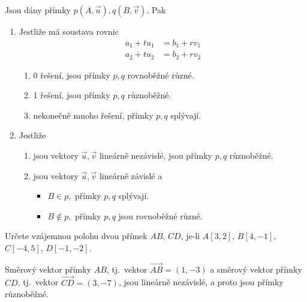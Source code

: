\begin{veta}
    Jsou dány přímky $p(A,\vec u), q(B,\vec v).$ Pak
    \begin{enumerate}[$i.$]
    \item Jestliže má soustava rovnic
    \begin{align*}
        a_1+tu_1 &= b_1 + rv_1 \\
        a_2+tu_2 &= b_2 + rv_2
    \end{align*}
    \begin{enumerate}[$a.$]
    \item 0 řešení, jsou přímky $p,q$ rovnoběžné různé.
   	\item 1 řešení, jsou přímky $p,q$ různoběžné.
   	\item nekonečně mnoho řešení, přímky $p,q$ splývají.
    \end{enumerate}
   	\item Jestliže
    \begin{enumerate}[$a.$]
    \item jsou vektory $\vec u, \vec v$ lineárně nezávislé, jsou přímky $p,q$ různoběžné.
   	\item jsou vektory $\vec u, \vec v$ lineárně závislé a
   	\begin{itemize}
    \item $B\in p,$ přímky $p,q$ splývají.
   	\item $B\notin p,$ přímky $p,q$ jsou rovnoběžné různé.
    \end{itemize}
    \end{enumerate}
    \end{enumerate}
\end{veta}
\begin{priklad}
Určete vzájemnou polohu dvou přímek $AB$, $CD$, je-li $A[3,2]$, $B[4,-1]$, $C[-4,5]$, $D[-1,-2]$.
\end{priklad}

\begin{reseni}
Směrový vektor přímky $AB$, tj.\ vektor $\overrightarrow{AB} = (1,-3)$ a směrový vektor přímky $CD$, tj.\
vektor $\overrightarrow{CD} = (3, -7)$, jsou lineárně nezávislé, a proto jsou přímky různoběžné.
\end{reseni}


